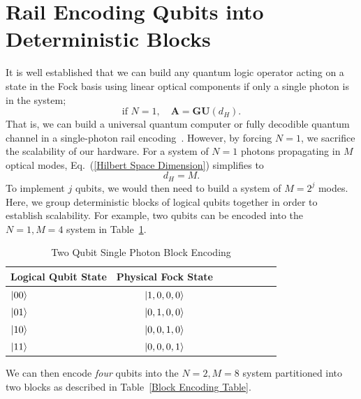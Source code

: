 \documentclass[aps,pra,twocolumn,showpacs,superscriptaddress,floatfix,10pt]{revtex4}
\begin{document}
\section{Rail Encoding Qubits into Deterministic Blocks}
\label{Section Block Encoding}
It is well established that we can build any quantum logic operator acting on a state in the Fock basis using linear optical components if only a single photon is in the system;
\begin{equation}
\label{Isomorphism}
	\mbox{if } N=1, \quad \textbf{A} = \textbf{GU}(d_H).
\end{equation}
That is, we can build a universal quantum computer or fully decodible quantum channel in a single-photon rail encoding~\cite{Adami,Review Paper}. However, by forcing $N=1$, we sacrifice the scalability of our hardware. For a system of $N=1$ photons propagating in $M$ optical modes, Eq.~(\ref{Hilbert Space Dimension}) simplifies to
\begin{equation}
d_H = M.
\end{equation}
To implement $j$ qubits, we would then need to build a system of $M=2^j$ modes. Here, we group deterministic blocks of logical qubits together in order to establish scalability. For example, two qubits can be encoded into the $N=1,M=4$ system in Table~\ref{Two Qubit Encoding Table}.
\begin {table}[h]
\begin{center}
	\begin{tabular}{l*{6}{c}r} 
		Logical Qubit State      \quad \quad \quad     & Physical Fock State \\
		\hline 
		\quad \quad \quad $\ket{00}$     & $\ket{1,0,0,0}$ \\
		\quad \quad \quad $\ket{01}$            & $\ket{0,1,0,0}$ \\
		\quad \quad \quad $\ket{10}$            & $\ket{0,0,1,0}$ \\
		\quad \quad \quad $\ket{11}$            & $\ket{0,0,0,1}$ \\
	\end{tabular}
	\caption{ \label{Two Qubit Encoding Table} Two Qubit Single Photon Block Encoding}
\end{center}
\end{table}
We can then encode \textit{four} qubits into the $N=2,M=8$ system partitioned into two blocks as described in Table~\ref{Block Encoding Table}.
\end{document}
